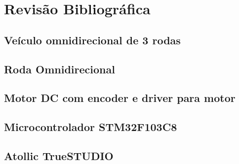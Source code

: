 
\chapter{Revisão Bibliográfica}


\section{Veículo omnidirecional de 3 rodas}


\section{Roda Omnidirecional}


\section{Motor DC com encoder e driver para motor}


\section{Microcontrolador STM32F103C8}


\section{Atollic TrueSTUDIO}


